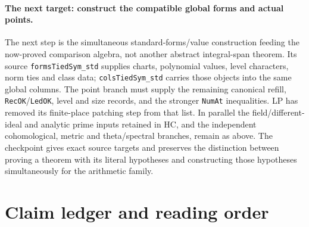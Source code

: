 \documentclass[11pt,a4paper]{article}
\numberwithin{equation}{section}
\theoremstyle{remark}\newtheorem{remark}[theorem]{Remark}
\begin{document}
\paragraph{The next target: construct the compatible global forms and actual points.}
The next step is the simultaneous standard-forms/value construction
feeding the now-proved comparison algebra, not another abstract
integral-span theorem. Its source \texttt{formsTiedSym\_std} supplies
charts, polynomial values, level characters, norm ties and class data;
\texttt{colsTiedSym\_std} carries those objects into the same global
columns. The point branch must supply the remaining canonical refill,
\texttt{RecOK}/\texttt{LedOK}, level and size records, and the stronger
\texttt{NumAt} inequalities. LP has removed its finite-place patching
step from that list. In parallel the field/different-ideal and analytic
prime inputs retained in HC, and the independent cohomological, metric
and theta/spectral branches, remain as above. The checkpoint gives
exact source targets and preserves the distinction between proving a
theorem with its literal hypotheses and constructing those hypotheses
simultaneously for the arithmetic family.

\section{Claim ledger and reading order}
\end{document}
